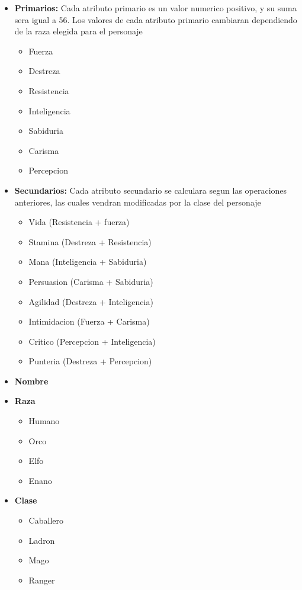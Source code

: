 \documentclass{article}
\begin{document}
\begin{itemize}[leftmargin=1cm]
\item \textbf{Primarios:}
Cada atributo primario es un valor numerico positivo, y su suma sera igual a 56.
Los valores de cada atributo primario cambiaran dependiendo de la raza elegida para el personaje
	\begin{itemize}
		\item Fuerza
		\item Destreza
		\item Resistencia
		\item Inteligencia
		\item Sabiduria
		\item Carisma
		\item Percepcion
	\end{itemize}

\item \textbf{Secundarios:}
Cada atributo secundario se calculara segun las operaciones anteriores, las cuales vendran modificadas por la clase
del personaje
	\begin{itemize}
		\item Vida		  	(Resistencia + fuerza)
		\item Stamina	  	(Destreza + Resistencia)
		\item Mana		  	(Inteligencia + Sabiduria)
		\item Persuasion   	(Carisma + Sabiduria)
		\item Agilidad	  	(Destreza + Inteligencia)
		\item Intimidacion 	(Fuerza + Carisma)
		\item Critico		(Percepcion + Inteligencia)
		\item Punteria		(Destreza + Percepcion)
	\end{itemize}

\item \textbf{Nombre}
\item \textbf{Raza}
	\begin{itemize}
		\item Humano
		\item Orco
		\item Elfo
		\item Enano
	\end{itemize}
\item \textbf{Clase}
	\begin{itemize}
		\item Caballero
		\item Ladron
		\item Mago
		\item Ranger
	\end{itemize}
\end{itemize}
\end{document}
